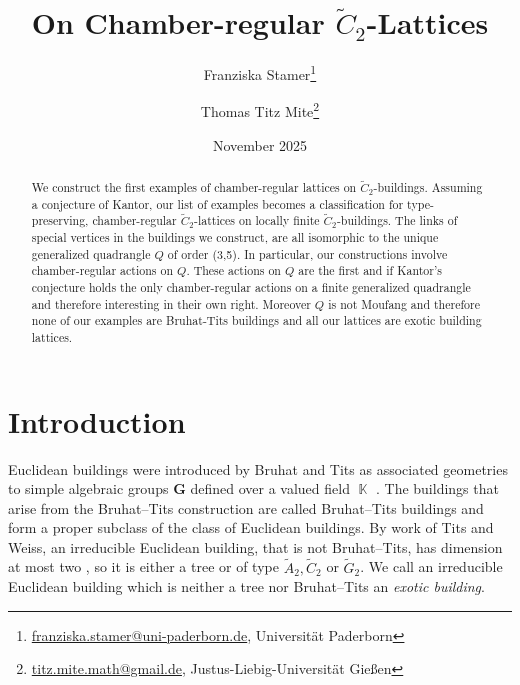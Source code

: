 \documentclass[dvipsnames]{article}
\title{On Chamber-regular $\tilde C_2$-Lattices}
\author{
    Franziska Stamer\thanks{\href{mailto:franziska.stamer@uni-paderborn.de}{franziska.stamer@uni-paderborn.de}, Universität Paderborn}
    \and
    Thomas Titz Mite\thanks{\href{mailto:titz.mite.math@gmail.de}{titz.mite.math@gmail.de}, Justus-Liebig-Universität Gießen}
}
\date{November 2025}
\theoremstyle{definition}
\theoremstyle{remark}
\DeclareMathOperator{\KK}{\mathbb K}
\begin{document}
\maketitle

\begin{abstract}
    We construct the first examples of chamber-regular lattices on $\tilde C_2$-buildings. Assuming a conjecture of Kantor, our list of examples becomes a classification for type-preserving, chamber-regular $\tilde C_2$-lattices on locally finite $\tilde C_2$-buildings. The links of special vertices in the buildings we construct, are all isomorphic to the unique generalized quadrangle $Q$ of order (3,5). In particular, our constructions involve chamber-regular actions on $Q$. These actions on $Q$ are the first and if Kantor's conjecture holds the only chamber-regular actions on a finite generalized quadrangle and therefore interesting in their own right. Moreover $Q$ is not Moufang and therefore none of our examples are Bruhat-Tits buildings and all our lattices are exotic building lattices.
\end{abstract}

\section{Introduction}

    Euclidean buildings were introduced by Bruhat and Tits as associated geometries to simple algebraic groups $\textbf{G}$ defined over a valued field $\KK$ \cite{BruhatTits1, BruhatTits2}. The buildings that arise from the Bruhat--Tits construction are called Bruhat--Tits buildings and form a proper subclass of the class of Euclidean buildings. By work of Tits and Weiss, an irreducible Euclidean building, that is not Bruhat--Tits, has dimension at most two \cite{Tits_classification,Weiss}, so it is either a tree or of type $\tilde A_2, \tilde C_2$ or $\tilde G_2$. We call an irreducible Euclidean building which is neither a tree nor Bruhat--Tits an \textit{exotic building}.
\end{document}
